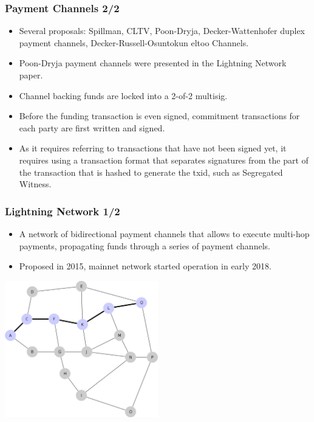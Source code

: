\documentclass{beamer}
\begin{document}
\begin{frame}
  \frametitle{Payment Channels 2/2}
  \begin{itemize}
  \item Several proposals: Spillman, CLTV, Poon-Dryja, Decker-Wattenhofer duplex
    payment channels, Decker-Russell-Osuntokun eltoo Channels.
  \item Poon-Dryja payment channels were presented in the Lightning Network
    paper.
  \item Channel backing funds are locked into a 2-of-2 multisig.
  \item Before the funding transaction is even signed, commitment transactions
    for each party are first written and signed.
  \item As it requires referring to transactions that have not been signed yet,
    it requires using a transaction format that separates signatures from the
    part of the transaction that is hashed to generate the txid, such as
    Segregated Witness.
  \end{itemize}
\end{frame}

\begin{frame}[fragile]
  \frametitle{Lightning Network 1/2}
  \begin{itemize}
  \item A network of bidirectional payment channels that allows to execute
    multi-hop payments, propagating funds through a series of payment channels.
  \item Proposed in 2015, mainnet network started operation in early 2018.
  \end{itemize}
  \begin{center}
    \includegraphics[width=0.5\textwidth]{ln}
  \end{center}
\end{frame}
\end{document}
